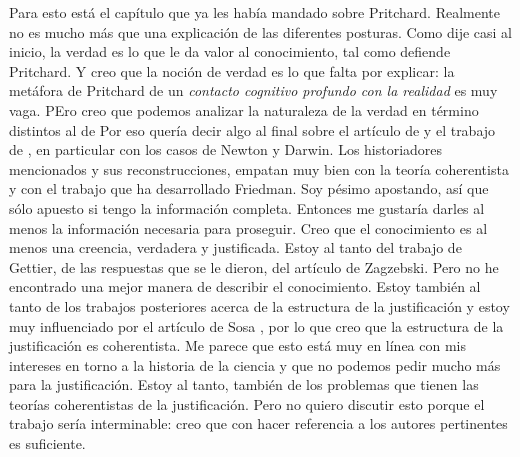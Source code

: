 Para esto está el capítulo que ya les había mandado sobre Pritchard.
Realmente no es mucho más que una explicación de las diferentes posturas.
Como dije casi al inicio, la verdad es lo que le da valor al conocimiento, tal como defiende Pritchard.
Y creo que la noción de verdad es lo que falta por explicar: la metáfora de Pritchard de un \emph{contacto cognitivo profundo con la realidad} es muy vaga.
PEro creo que podemos analizar la naturaleza de la verdad en término distintos al de 
Por eso quería decir algo al final sobre el artículo de \textcite{klein2019} y el trabajo de \textcite{friedman, friedmana}, en particular con los casos de Newton y Darwin.
Los historiadores mencionados y sus reconstrucciones, empatan muy bien con la teoría coherentista y con el trabajo que ha desarrollado Friedman.
Soy pésimo apostando, así que sólo apuesto si tengo la información completa.
Entonces me gustaría darles al menos la información necesaria para proseguir.
Creo que el conocimiento es al menos una creencia, verdadera y justificada.
Estoy al tanto del trabajo de Gettier, de las respuestas que se le dieron, del artículo de Zagzebski.
Pero no he encontrado una mejor manera de describir el conocimiento.
Estoy también al tanto de los trabajos posteriores acerca de la estructura de la justificación y estoy muy influenciado por el artículo de Sosa \textcite{Sosa1991}, por lo que creo que la estructura de la justificación es coherentista.
Me parece que esto está muy en línea con mis intereses en torno a la historia de la ciencia y que no podemos pedir mucho más para la justificación.
Estoy al tanto, también de los problemas que tienen las teorías coherentistas de la justificación.
Pero no quiero discutir esto porque el trabajo sería interminable: creo que con hacer referencia a los autores pertinentes es suficiente.

